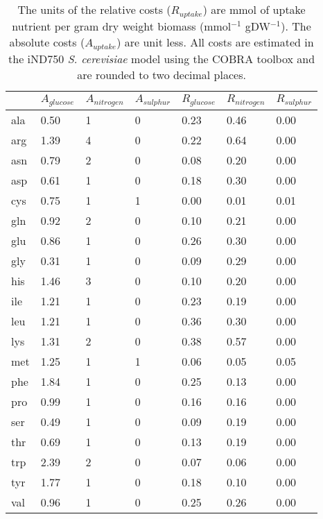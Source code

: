 \begin{table}%
\begin{footnotesize}
  \begin{tabular}{ p{1cm} *{6}{p{1.9cm}} }
  \toprule
      & $A_{glucose}$ & $A_{nitrogen}$ & $A_{sulphur}$ & $R_{glucose}$ & $R_{nitrogen}$ & $R_{sulphur}$ \\ \midrule
      ala & 0.50 & 1 & 0 & 0.23 & 0.46 & 0.00 \\
      arg & 1.39 & 4 & 0 & 0.22 & 0.64 & 0.00 \\
      asn & 0.79 & 2 & 0 & 0.08 & 0.20 & 0.00 \\
      asp & 0.61 & 1 & 0 & 0.18 & 0.30 & 0.00 \\
      cys & 0.75 & 1 & 1 & 0.00 & 0.01 & 0.01 \\
      gln & 0.92 & 2 & 0 & 0.10 & 0.21 & 0.00 \\
      glu & 0.86 & 1 & 0 & 0.26 & 0.30 & 0.00 \\
      gly & 0.31 & 1 & 0 & 0.09 & 0.29 & 0.00 \\
      his & 1.46 & 3 & 0 & 0.10 & 0.20 & 0.00 \\
      ile & 1.21 & 1 & 0 & 0.23 & 0.19 & 0.00 \\
      leu & 1.21 & 1 & 0 & 0.36 & 0.30 & 0.00 \\
      lys & 1.31 & 2 & 0 & 0.38 & 0.57 & 0.00 \\
      met & 1.25 & 1 & 1 & 0.06 & 0.05 & 0.05 \\
      phe & 1.84 & 1 & 0 & 0.25 & 0.13 & 0.00 \\
      pro & 0.99 & 1 & 0 & 0.16 & 0.16 & 0.00 \\
      ser & 0.49 & 1 & 0 & 0.09 & 0.19 & 0.00 \\
      thr & 0.69 & 1 & 0 & 0.13 & 0.19 & 0.00 \\
      trp & 2.39 & 2 & 0 & 0.07 & 0.06 & 0.00 \\
      tyr & 1.77 & 1 & 0 & 0.18 & 0.10 & 0.00 \\
      val & 0.96 & 1 & 0 & 0.25 & 0.26 & 0.00 \\ \bottomrule
  \end{tabular}
\end{footnotesize}
\caption[\emph{S. cerevisiae} estimated absolute and relative amino acid costs]{The units of the relative costs ($R_{uptake}$) are mmol of uptake nutrient per gram dry weight biomass (mmol$^{-1}$ gDW$^{-1}$). The absolute costs ($A_{uptake}$) are unit less. All costs are estimated in the iND750 \emph{S. cerevisiae} model using the COBRA toolbox and are rounded to two decimal places.}
\label{table:estimated_costs}
\end{table}%


